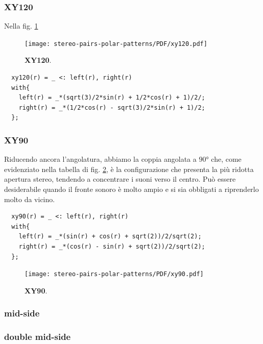\subsubsection*{XY120}
Nella fig. \ref{xy120}
\begin{figure}[h]
\begin{center}
\texttt{[image: stereo-pairs-polar-patterns/PDF/xy120.pdf]}
\caption{\textbf{XY120}.}
\label{xy120}
\end{center}
\end{figure}
\begin{lstlisting}
  xy120(r) = _ <: left(r), right(r)
  with{
    left(r) = _*(sqrt(3)/2*sin(r) + 1/2*cos(r) + 1)/2/;
    right(r) = _*(1/2*cos(r) - sqrt(3)/2*sin(r) + 1)/2;
  };
\end{lstlisting}
\subsubsection*{XY90}
Riducendo ancora l’angolatura, abbiamo la coppia angolata a $90°$ che, come
evidenziato nella tabella di fig. \ref{xy90}, è la configurazione
che presenta la più ridotta apertura stereo, tendendo a concentrare i suoni
verso il centro. Può essere desiderabile quando il fronte sonoro è molto ampio
e si sia obbligati a riprenderlo molto da vicino.
\begin{lstlisting}
  xy90(r) = _ <: left(r), right(r)
  with{
    left(r) = _*(sin(r) + cos(r) + sqrt(2))/2/sqrt(2);
    right(r) = _*(cos(r) - sin(r) + sqrt(2))/2/sqrt(2);
  };
\end{lstlisting}
\begin{figure}[h]
\begin{center}
\texttt{[image: stereo-pairs-polar-patterns/PDF/xy90.pdf]}
\caption{\textbf{XY90}.}
\label{xy90}
\end{center}
\end{figure}
\subsubsection*{mid-side}
\subsubsection*{double mid-side}
